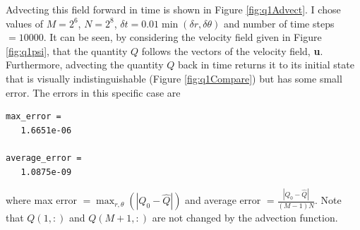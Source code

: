 \documentclass{article}
\begin{document}
Advecting this field forward in time is shown in Figure \ref{fig:q1Advect}. I chose values of $M = 2^6$, $N=2^8$, $\delta t = 0.01 \min(\delta r, \delta \theta)$ and number of time steps $= 10000$. It can be seen, by considering the velocity field given in Figure \ref{fig:q1psi}, that the quantity $Q$ follows the vectors of the velocity field, \textbf{u}. Furthermore, advecting the quantity $Q$ back in time returns it to its initial state that is visually indistinguishable (Figure \ref{fig:q1Compare}) but has some small error. The errors in this specific case are

\begin{verbatim}
max_error =
   1.6651e-06

average_error =
   1.0875e-09
\end{verbatim}

where max error $= \max_{r,\theta}(|Q_0 - \hat{Q}|)$ and average error $= \frac{|Q_0 - \hat{Q}|}{(M-1)N}$. Note that $Q(1,:)$ and $Q(M+1,:)$ are not changed by the advection function.
\end{document}
